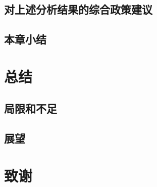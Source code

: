 \newpage
\subsection{对上述分析结果的综合政策建议}

\newpage
\subsection{本章小结}

\newpage
\section{总结}

\newpage
\subsection{局限和不足}
\subsection{展望}

\newpage
\section{致谢}
















